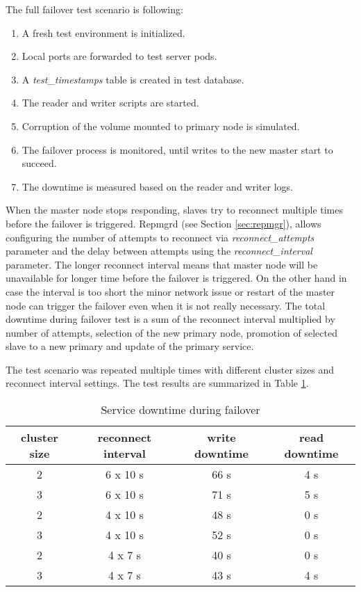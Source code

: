 \documentclass[
  digital, %
  twoside, %
  table,   %
  lof,     %
  lot,     %
]{fithesis3}
\begin{document}
The full failover test scenario is following:
\begin{enumerate}
  \item  A fresh test environment is initialized. 
  \item Local ports are forwarded to test server pods.
  \item A \textit{test\_timestamps} table is created in test database.
  \item The reader and writer scripts are started.
  \item Corruption of the volume mounted to primary node is simulated.
  \item The failover process is monitored, until writes to the new master start to succeed.
  \item The downtime is measured based on the reader and writer logs.
\end{enumerate}

When the master node stops responding, slaves try to reconnect multiple times before the failover is triggered. Repmgrd (see Section \ref{sec:repmgr}), allows configuring the number of attempts to reconnect via \textit{reconnect\_attempts} parameter and the delay between attempts using the \textit{reconnect\_interval} parameter. The longer reconnect interval means that master node will be unavailable for longer time before the failover is triggered. On the other hand in case the interval is too short the minor network issue or restart of the master node can trigger the failover even when it is not really necessary. The total downtime during failover test is a sum of the reconnect interval multiplied by number of attempts, selection of the new primary node, promotion of selected slave to a new primary and update of the primary service.

The test scenario was repeated multiple times with different cluster sizes and reconnect interval settings. The test results are summarized in Table \ref{table:failover_testing}.

\begin{table}[ht!]
\centering
\begin{tabular}{|c c c c|}
 \hline
 cluster size & reconnect interval & write downtime & read downtime \\ [0.5ex]
 \hline
 2 & 6 x 10 s & 66 s & 4 s \\
 3 & 6 x 10 s & 71 s & 5 s \\
 2 & 4 x 10 s & 48 s & 0 s \\
 3 & 4 x 10 s & 52 s & 0 s \\
 2 & 4 x 7 s  & 40 s & 0 s  \\ 
 3 & 4 x 7 s  & 43 s & 4 s  \\ [1ex]
 \hline
\end{tabular}
\caption{Service downtime during failover}
\label{table:failover_testing}
\end{table}
\end{document}
